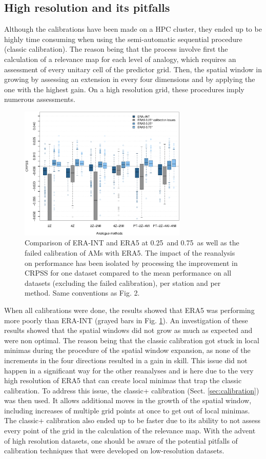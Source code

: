 \documentclass[alpha-refs]{wiley-article}
\begin{document}
\subsection{High resolution and its pitfalls}
\label{sec:results_hires}

Although the calibrations have been made on a HPC cluster, they ended up to be highly time consuming when using the semi-automatic sequential procedure (classic calibration). The reason being that the process involve first the calculation of a relevance map for each level of analogy, which requires an assessment of every unitary cell of the predictor grid. Then, the spatial window in growing by assessing an extension in every four dimensions and by applying the one with the highest gain. On a high resolution grid, these procedures imply numerous assessments.

\begin{figure}[bt]
	\centering
	\includegraphics[width=80mm]{figures/boxplot-resol-diff.pdf}
	\caption{Comparison of ERA-INT and ERA5 at 0.25\degree\ and 0.75\degree\ as well as the failed calibration of AMs with ERA5. The impact of the reanalysis on performance has been isolated by processing the improvement in CRPSS for one dataset compared to the mean performance on all datasets (excluding the failed calibration), per station and per method. Same conventions as Fig. 2.}
	\label{fig:resolution}
\end{figure}

When all calibrations were done, the results showed that ERA5 was performing more poorly than ERA-INT (grayed bars in Fig. \ref{fig:resolution}). An investigation of these results showed that the spatial windows did not grow as much as expected and were non optimal. The reason being that the classic calibration got stuck in local minimas during the procedure of the spatial window expansion, as none of the increments in the four directions resulted in a gain in skill. This issue did not happen in a significant way for the other reanalyses and is here due to the very high resolution of ERA5 that can create local minimas that trap the classic calibration. To address this issue, the classic+ calibration (Sect. \ref{sec:calibration}) was then used. It allows additional moves in the growth of the spatial window, including increases of multiple grid points at once to get out of local minimas. The classic+ calibration also ended up to be faster due to its ability to not assess every point of the grid in the calculation of the relevance map. With the advent of high resolution datasets, one should be aware of the potential pitfalls of calibration techniques that were developed on low-resolution datasets.
\end{document}
